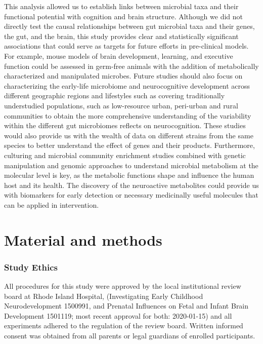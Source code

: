 \documentclass{article}
\begin{document}
This analysis allowed us to establish links between microbial taxa and
their functional potential with cognition and brain structure. 
Although we did not directly test the causal relationships
between gut microbial taxa and their genes, the gut, and the brain,
this study provides clear and statistically significant associations
that could serve as targets for future efforts in pre-clinical models.
For example, mouse models of brain development, learning, and executive function
could be assessed in germ-free animals with the addition of
metabolically characterized and manipulated microbes.
Future studies should also focus on characterizing the early-life microbiome
and neurocognitive development across different geographic regions
and lifestyles such as covering traditionally understudied populations,
such as low-resource urban, peri-urban and rural communities
to obtain the more comprehensive understanding of the
variability within the different gut microbiomes reflects on
neurocognition. These studies would also provide us with the wealth of
data on different strains from the same species to better understand the
effect of genes and their products. Furthermore, culturing and microbial
community enrichment studies combined with genetic manipulation and
genomic approaches to understand microbial metabolism at the molecular
level is key, as the metabolic functions shape and influence the
human host and its health. The discovery of the neuroactive metabolites
could provide us with biomarkers for early detection or necessary
medicinally useful molecules that can be applied in intervention.

\section*{Material and methods}

\subsubsection*{Study Ethics}

All procedures for this study were approved by the local institutional
review board at Rhode Island Hospital, 
(Investigating Early Childhood Neurodevelopment 1500991,
and Prenatal Influences on Fetal and Infant Brain Development 1501119;
most recent approval for both: 2020-01-15)
and all experiments adhered to
the regulation of the review board. Written informed consent was
obtained from all parents or legal guardians of enrolled participants.
\end{document}
